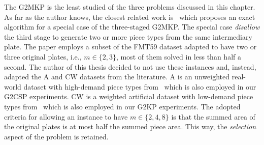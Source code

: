 The G2MKP is the least studied of the three problems discussed in this chapter.
As far as the author knows, the closest related work is~\citet{cui:2008} which proposes an exact algorithm for a special case of the three-staged G2MKP.
The special case \emph{disallow} the third stage to generate two or more piece types from the same intermediary plate.
The paper employs a subset of the FMT59 dataset adapted to have two or three original plates, i.e., \(m \in \{2, 3\}\), most of them solved in less than half a second.
The author of this thesis decided to not use these instances and, instead, adapted the A and CW datasets from the literature.
A is an unweighted real-world dataset with high-demand piece types from~\citet{macedo:2010} which is also employed in our G2CSP experiments.
CW is a weighted artificial dataset with low-demand piece types from~\citet{fayard:1998} which is also employed in our G2KP experiments.
The adopted criteria for allowing an instance to have \(m \in \{2, 4, 8\}\) is that the summed area of the original plates is at most half the summed piece area.
This way, the \emph{selection} aspect of the problem is retained.

